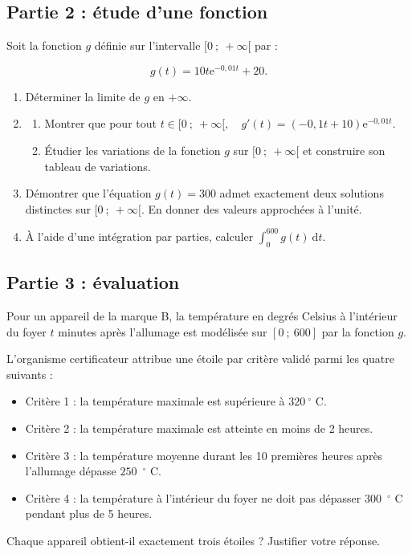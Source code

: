 \documentclass[10pt]{article}
\providecommand{\e}{{\mathrm{e}}}
\begin{document}
\subsection*{Partie 2 : étude d'une fonction}
Soit la fonction $g$ définie sur l'intervalle $[0~;~+ \infty[ $ par :

\[g(t) = 10 t \e^{-0,01 t} + 20.\]

\begin{enumerate}
	\item Déterminer la limite de $g$ en $+ \infty$.
	\item \begin{enumerate}
		\item Montrer que pour tout $t \in [0~;~+ \infty[,\quad g'(t)=(-0,1 t + 10) \e^{- 0,01 t}$.
		\item Étudier les variations de la fonction $g$ sur $[0~;~+ \infty[$ et construire son tableau de variations.
	\end{enumerate}
	\item Démontrer que l'équation $g(t) = 300$ admet exactement deux solutions distinctes sur [$0~;~+ \infty[$. En donner des valeurs approchées à l'unité.
	\item À l'aide d'une intégration par parties, calculer \quad $\displaystyle \int_{0}^{600} g(t) \:\text{d}t$.
\end{enumerate}

\subsection*{Partie 3 : évaluation}
Pour un appareil de la marque B, la température en degrés Celsius à l'intérieur du foyer $t$ minutes après l'allumage est modélisée sur $[0~;~600]$ par la fonction $g$.

L'organisme certificateur attribue une étoile par critère validé parmi les quatre suivants :

\begin{itemize}
\item Critère 1 : la température maximale est supérieure à $320~$\ensuremath{^\circ} C.
\item Critère 2 : la température maximale est atteinte en moins de 2 heures.
\item Critère 3 : la température moyenne durant les 10 premières heures après l'allumage dépasse $250$~\ensuremath{^\circ} C.
\item Critère 4 : la température à l'intérieur du foyer ne doit pas dépasser $300$~\ensuremath{^\circ} C pendant plus de 5 heures.
\end{itemize}

Chaque appareil obtient-il exactement trois étoiles ? Justifier votre réponse.
\end{document}
